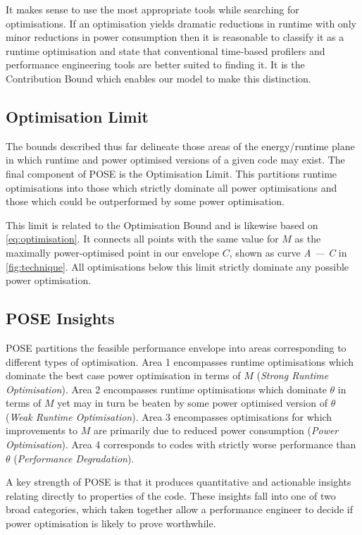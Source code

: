 It makes sense to use the most appropriate tools while searching for optimisations.
If an optimisation yields dramatic reductions in runtime with only minor reductions in power consumption then it is reasonable to classify it as a runtime optimisation and state that conventional time-based profilers and performance engineering tools are better suited to finding it.
It is the Contribution Bound which enables our model to make this distinction.

\subsection{Optimisation Limit}
\noindent
The bounds described thus far delineate those areas of the energy/runtime plane in which runtime and power optimised versions of a given code may exist.
The final component of POSE is the Optimisation Limit.
This partitions runtime optimisations into those which strictly dominate all power optimisations and those which could be outperformed by some power optimisation.

This limit is related to the Optimisation Bound and is likewise based on \autoref{eq:optimisation}.
It connects all points with the same value for $M$ as the maximally power-optimised point in our envelope $C$, shown as curve \emph{A --- C} in \autoref{fig:technique}.
All optimisations below this limit strictly dominate any possible power optimisation.

\subsection{POSE Insights}
\noindent
POSE partitions the feasible performance envelope into areas corresponding to different types of optimisation.
Area 1 encompasses runtime optimisations which dominate the best case power optimisation in terms of $M$ (\emph{Strong Runtime Optimisation}).
Area 2 encompasses runtime optimisations which dominate $\theta$ in terms of $M$ yet may in turn be beaten by some power optimised version of $\theta$ (\emph{Weak Runtime Optimisation}).
Area 3 encompasses optimisations for which improvements to $M$ are primarily due to reduced power consumption (\emph{Power Optimisation}).
Area 4 corresponds to codes with strictly worse performance than $\theta$ (\emph{Performance Degradation}).

A key strength of POSE is that it produces quantitative and actionable insights relating directly to properties of the code.
These insights fall into one of two broad categories, which taken together allow a performance engineer to decide if power optimisation is likely to prove worthwhile.

